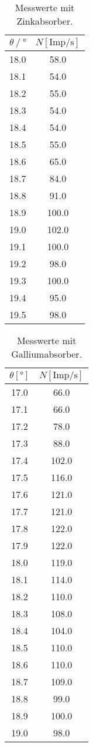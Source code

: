   \begin{table}
    \centering
    \caption{Messwerte mit Zinkabsorber.}
    \label{tab:zinktab}
    \begin{tabular}{c c}
      \toprule
      $\theta \mathbin{/}°$ & $N [\text{Imp}/\si{\s}]$ \\
      \midrule
      18.0	& 58.0\\
      18.1	& 54.0\\
      18.2	& 55.0\\
      18.3	& 54.0\\
      18.4	& 54.0\\
      18.5	& 55.0\\
      18.6	& 65.0\\
      18.7	& 84.0\\
      18.8	& 91.0\\
      18.9	& 100.0\\
      19.0	& 102.0\\
      19.1	& 100.0\\
      19.2	& 98.0\\
      19.3	& 100.0\\
      19.4	& 95.0\\
      19.5	& 98.0\\
      \bottomrule
    \end{tabular}
  \end{table}

  \begin{table}
    \centering
    \caption{Messwerte mit Galliumabsorber.}
    \label{tab:galliumtab}
    \begin{tabular}{c c}
      \toprule
      $\theta [°]$ & $N [\text{Imp}/\si{\s}]$ \\
      \midrule
      17.0	& 66.0\\
      17.1	& 66.0\\
      17.2	& 78.0\\
      17.3	& 88.0\\
      17.4	& 102.0\\
      17.5	& 116.0\\
      17.6	& 121.0\\
      17.7	& 121.0\\
      17.8	& 122.0\\
      17.9	& 122.0\\
      18.0	& 119.0\\
      18.1	& 114.0\\
      18.2	& 110.0\\
      18.3	& 108.0\\
      18.4	& 104.0\\
      18.5	& 110.0\\
      18.6	& 110.0\\
      18.7	& 109.0\\
      18.8	& 99.0\\
      18.9	& 100.0\\
      19.0	& 98.0\\
      \bottomrule
    \end{tabular}
  \end{table}

